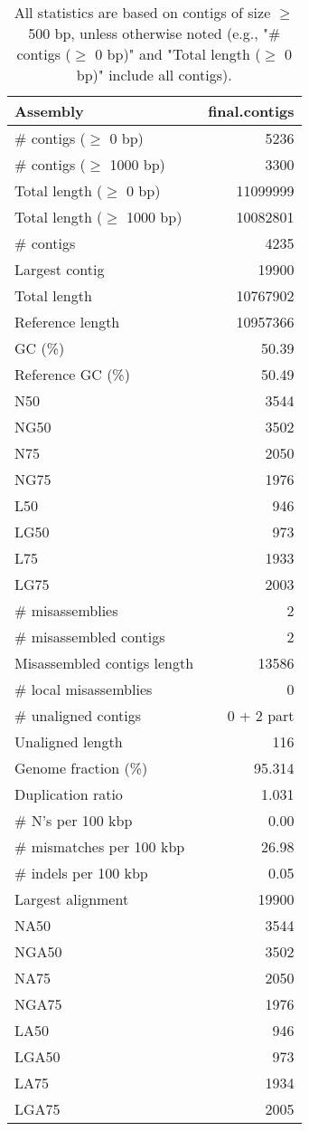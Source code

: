 \documentclass[12pt,a4paper]{article}
\begin{document}
\begin{table}[ht]
\begin{center}
\caption{All statistics are based on contigs of size $\geq$ 500 bp, unless otherwise noted (e.g., "\# contigs ($\geq$ 0 bp)" and "Total length ($\geq$ 0 bp)" include all contigs).}
\begin{tabular}{|l*{1}{|r}|}
\hline
Assembly & final.contigs \\ \hline
\# contigs ($\geq$ 0 bp) & 5236 \\ \hline
\# contigs ($\geq$ 1000 bp) & 3300 \\ \hline
Total length ($\geq$ 0 bp) & 11099999 \\ \hline
Total length ($\geq$ 1000 bp) & 10082801 \\ \hline
\# contigs & 4235 \\ \hline
Largest contig & 19900 \\ \hline
Total length & 10767902 \\ \hline
Reference length & 10957366 \\ \hline
GC (\%) & 50.39 \\ \hline
Reference GC (\%) & 50.49 \\ \hline
N50 & 3544 \\ \hline
NG50 & 3502 \\ \hline
N75 & 2050 \\ \hline
NG75 & 1976 \\ \hline
L50 & 946 \\ \hline
LG50 & 973 \\ \hline
L75 & 1933 \\ \hline
LG75 & 2003 \\ \hline
\# misassemblies & 2 \\ \hline
\# misassembled contigs & 2 \\ \hline
Misassembled contigs length & 13586 \\ \hline
\# local misassemblies & 0 \\ \hline
\# unaligned contigs & 0 + 2 part \\ \hline
Unaligned length & 116 \\ \hline
Genome fraction (\%) & 95.314 \\ \hline
Duplication ratio & 1.031 \\ \hline
\# N's per 100 kbp & 0.00 \\ \hline
\# mismatches per 100 kbp & 26.98 \\ \hline
\# indels per 100 kbp & 0.05 \\ \hline
Largest alignment & 19900 \\ \hline
NA50 & 3544 \\ \hline
NGA50 & 3502 \\ \hline
NA75 & 2050 \\ \hline
NGA75 & 1976 \\ \hline
LA50 & 946 \\ \hline
LGA50 & 973 \\ \hline
LA75 & 1934 \\ \hline
LGA75 & 2005 \\ \hline
\end{tabular}
\end{center}
\end{table}
\end{document}
